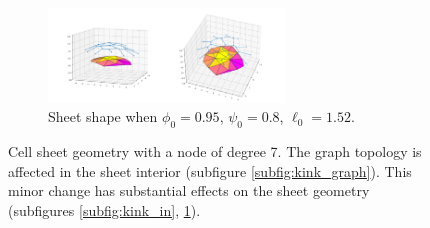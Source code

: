 \documentclass[draft]{article}
\begin{document}
\begin{figure}[htbp]
\begin{subfigure}[b]{\textwidth}
        \includegraphics[width=0.69\textwidth]{figures/numerical/kink/kink0.95_0.8_1.52_10_plot.png}
        \caption{Sheet shape when $\phi_0=0.95$, $\psi_0=0.8$, $\ell_0=1.52$.}
        \label{subfig:kink_out}
    \end{subfigure}
    \caption{Cell sheet geometry with a node of degree 7. The graph topology is affected in the sheet interior (subfigure \ref{subfig:kink_graph}). This minor change has substantial effects on the sheet geometry (subfigures \ref{subfig:kink_in}, \ref{subfig:kink_out}).}
    \label{fig:kink}
\end{figure}
\end{document}
